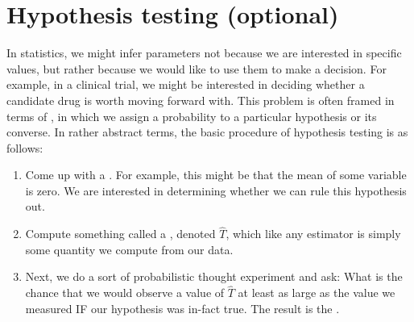 \section{Hypothesis testing (optional)}
In statistics, we might infer parameters not because we are interested in specific values, but rather because we would like to use them to make a decision. For example, in a clinical trial, we might be interested in deciding whether a candidate drug is worth moving forward with. This problem is often framed in terms of , in which we assign a probability to a particular hypothesis or its converse. 
In rather abstract terms, the basic procedure of hypothesis testing is as follows:
\begin{enumerate}
\item Come up with a . For example, this might be that the mean of some variable is zero. We are interested in determining whether we can rule this hypothesis out. 
\item Compute something called a , denoted $\hat{T}$, which like any estimator is simply some quantity we compute from our data. 
\item Next, we do a sort of probabilistic thought experiment and ask: What is the chance that we would observe a value of $\hat{T}$ at least as large as the value we measured  IF our hypothesis was in-fact true.  The result is the . 
\end{enumerate}

